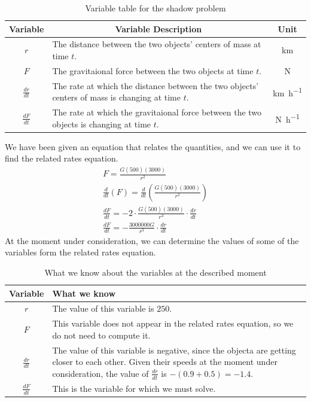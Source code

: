 \documentclass[10pt,oneside,]{book}
\theoremstyle{plain}
\theoremstyle{definition}
\numberwithin{equation}{section}
\newcommand{\lz}[2]{\frac{d#1}{d#2}}
\newcommand{\lzoo}[2]{{\frac{d}{d#1}}{\left(#2\right)}}
\begin{document}
\begin{table}
\centering
\caption{Variable table for the shadow problem\label{table-45}}
\begin{tabular}{cp{3.5in}c}
\toprule
Variable&\multicolumn{1}{c}{Variable Description}&Unit\\
\midrule
\(r\)&The distance between the two objects' centers of mass at time \(t\).&\si{\kilo\meter}\\
\midrule
\(F\)&The gravitaional force between the two objects at time \(t\).&\si{\newton}\\
\midrule
\(\lz{r}{t}\)&The rate at which the distance between the two objects' centers of mass is changing at time \(t\).&\si{\kilo\meter\per\hour}\\
\midrule
\(\lz{F}{t}\)&The rate at which the gravitaional force between the two objects is changing at time \(t\).&\si{\newton\per\hour}\\
\bottomrule
\end{tabular}
\end{table}
\par
We have been given an equation that relates the quantities, and we can use it to find the related rates equation.\begin{gather*}
F=\frac{G(500)(3000)}{r^2}\\
\lzoo{t}{F}=\lzoo{t}{\frac{G(500)(3000)}{r^2}}\\
\lz{F}{t}=-2\cdot\frac{G(500)(3000)}{r^3}\cdot\lz{r}{t}\\
\lz{F}{t}=-\frac{3000000G}{r^3}\cdot\lz{r}{t}
\end{gather*}At the moment under consideration, we can determine the values of some of the variables form the related rates equation.%
\begin{table}
\centering
\caption{What we know about the variables at the described moment\label{table-46}}
\begin{tabular}{cp{4in}}
\toprule
Variable&What we know\\
\midrule
\(r\)&The value of this variable is \(250\).\\
\midrule
\(F\)&This variable does not appear in the related rates equation, so we do not need to compute it.\\
\midrule
\(\lz{r}{t}\)&The value of this variable is negative, since the objecta are getting closer to each other. Given their speeds at the moment under consideration, the value of \(\lz{r}{t}\) is \(-(0.9+0.5)=-1.4\).\\
\midrule
\(\lz{F}{t}\)&This is the variable for which we must solve.\\
\bottomrule
\end{tabular}
\end{table}
\end{document}
